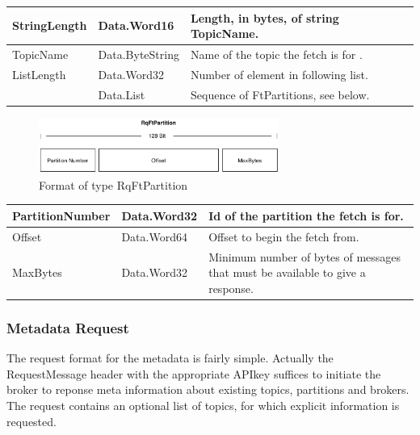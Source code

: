 \begin{table}[H]
\centering
\begin{tabular}{ l  l  p{10cm} }
\hline
StringLength      & Data.Word16     & Length, in bytes, of string TopicName.              \\ \hline
TopicName         & Data.ByteString & Name of the topic the fetch is for . \\ \hline
ListLength        & Data.Word32     & Number of element in following list.                \\ \hline
[RqFtPartition]     & Data.List       & Sequence of FtPartitions, see below.                \\ \hline
\end{tabular}
\end{table}

\begin{figure}[H]
    \centering
    \includegraphics[width=0.7\textwidth]{images/impl-prot-types-ftPartition.png}
    \caption{Format of type RqFtPartition }
    \label{fig:impl-prot-types-ftPartition}
\end{figure}

\begin{table}[H]
\centering
\begin{tabular}{ l  l  p{10cm} }
\hline
PartitionNumber & Data.Word32 & Id of the partition the fetch is for.                                          \\ \hline
Offset          & Data.Word64 & Offset to begin the fetch from.                                                \\ \hline
MaxBytes        & Data.Word32 & Minimum number of bytes of messages that must be available to give a response. \\ \hline
\end{tabular}
\end{table}

\subsubsection{Metadata Request}
The request format for the metadata is fairly simple. Actually the
RequestMessage header with the appropriate APIkey suffices to initiate the
broker to reponse meta information about existing topics, partitions and
brokers. The request contains an optional list of topics, for which explicit
information is requested.

